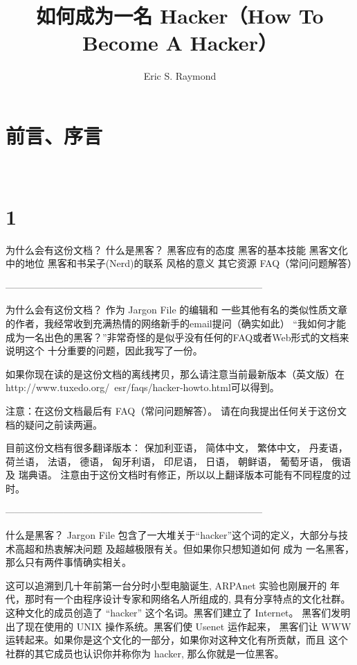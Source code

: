 \documentclass[a4paper,12pt,UTF8,twoside]{ctexbook}
\title{\heiti\zihao{0} 如何成为一名 Hacker（How To Become A Hacker）}
\author{Eric S. Raymond}
\date{}
\begin{document}
\maketitle
\tableofcontents

\frontmatter
\chapter{前言、序言}

\mainmatter

~\\

 \qquad  

\chapter{1}

为什么会有这份文档？
什么是黑客？
黑客应有的态度
黑客的基本技能
黑客文化中的地位
黑客和书呆子(Nerd)的联系
风格的意义
其它资源
FAQ（常问问题解答）

--------------------------------------------------------------------------------

为什么会有这份文档？
作为 Jargon File 的编辑和 一些其他有名的类似性质文章的作者，我经常收到充满热情的网络新手的email提问（确实如此） “我如何才能成为一名出色的黑客？”非常奇怪的是似乎没有任何的FAQ或者Web形式的文档来说明这个 十分重要的问题，因此我写了一份。

如果你现在读的是这份文档的离线拷贝，那么请注意当前最新版本（英文版）在 http://www.tuxedo.org/~esr/faqs/hacker-howto.html可以得到。

注意：在这份文档最后有 FAQ（常问问题解答）。 请在向我提出任何关于这份文档的疑问之前读两遍。

目前这份文档有很多翻译版本： 保加利亚语， 简体中文， 繁体中文， 丹麦语， 荷兰语， 法语， 德语， 匈牙利语， 印尼语， 日语， 朝鲜语， 葡萄牙语， 俄语及 瑞典语。 注意由于这份文档时有修正，所以以上翻译版本可能有不同程度的过时。


--------------------------------------------------------------------------------

什么是黑客？
Jargon File 包含了一大堆关于“hacker”这个词的定义，大部分与技术高超和热衷解决问题 及超越极限有关。但如果你只想知道如何 成为 一名黑客， 那么只有两件事情确实相关。

这可以追溯到几十年前第一台分时小型电脑诞生, ARPAnet 实验也刚展开的 年代，那时有一个由程序设计专家和网络名人所组成的, 具有分享特点的文化社群。 这种文化的成员创造了 “hacker” 这个名词。黑客们建立了 Internet。 黑客们发明出了现在使用的 UNIX 操作系统。黑客们使 Usenet 运作起来， 黑客们让 WWW 运转起来。如果你是这个文化的一部分，如果你对这种文化有所贡献，而且 这个社群的其它成员也认识你并称你为 hacker, 那么你就是一位黑客。
\end{document}
